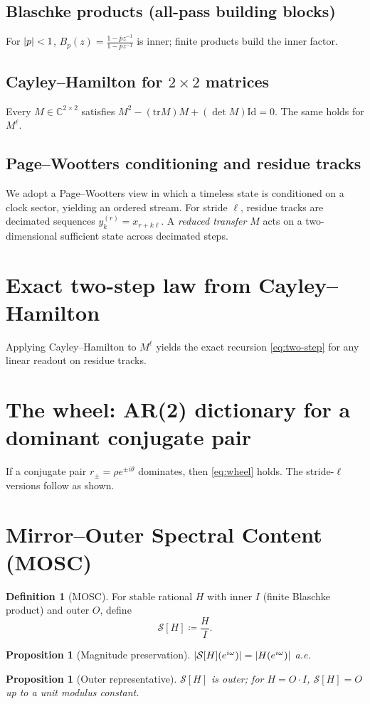 \documentclass[12pt]{article}
\newtheorem{proposition}[theorem]{Proposition}
\theoremstyle{definition}
\newtheorem{definition}[theorem]{Definition}
\newcommand{\C}{\mathbb{C}}
\newcommand{\Id}{\mathrm{Id}}
\newcommand{\tr}{\mathrm{tr}}
\newcommand{\defeq}{\coloneqq}
\DeclarePairedDelimiter{\abs}{\lvert}{\rvert}
\begin{document}
\subsection{Blaschke products (all-pass building blocks)}
For $\abs{p}<1$,
\(
B_p(z)=\frac{1-\bar p z^{-1}}{1-p z^{-1}}
\)
is inner; finite products build the inner factor.

\subsection{Cayley--Hamilton for $2\times2$ matrices}
Every $M\in\C^{2\times2}$ satisfies $M^2-(\tr M)M+(\det M)\Id=0$. The same holds for $M^\ell$.

\subsection{Page--Wootters conditioning and residue tracks}
We adopt a Page--Wootters view in which a timeless state is conditioned on a clock sector, yielding an ordered stream. For stride $\ell$, residue tracks are decimated sequences $y_k^{(r)}=x_{r+k\ell}$. A \emph{reduced transfer} $M$ acts on a two-dimensional sufficient state across decimated steps.

\section{Exact two-step law from Cayley--Hamilton}
Applying Cayley--Hamilton to $M^\ell$ yields the exact recursion \eqref{eq:two-step} for any linear readout on residue tracks.

\section{The wheel: AR(2) dictionary for a dominant conjugate pair}
If a conjugate pair $r_\pm=\rho e^{\pm i\theta}$ dominates, then \eqref{eq:wheel} holds. The stride-$\ell$ versions follow as shown.

\section{Mirror--Outer Spectral Content (MOSC)}
\begin{definition}[MOSC]
For stable rational $H$ with inner $I$ (finite Blaschke product) and outer $O$, define
\begin{equation}
\mathcal{S}[H]\defeq \frac{H}{I}.
\label{eq:mosc-def}
\end{equation}
\end{definition}
\begin{proposition}[Magnitude preservation]\label{prop:mag-preserve}
$\abs{\mathcal{S}[H](e^{i\omega})}=\abs{H(e^{i\omega})}$ a.e.
\end{proposition}
\begin{proposition}[Outer representative]\label{prop:outer}
$\mathcal{S}[H]$ is outer; for $H=O\cdot I$, $\mathcal{S}[H]=O$ up to a unit modulus constant.
\end{proposition}
\end{document}
